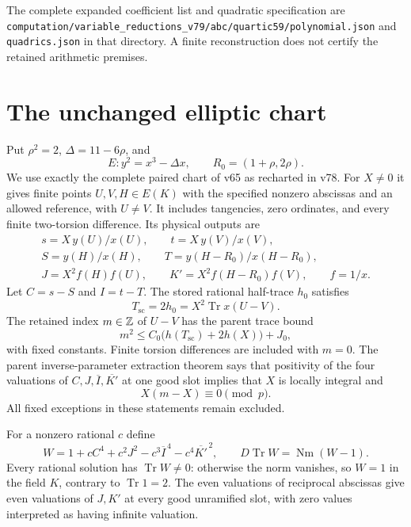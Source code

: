 \documentclass[11pt,a4paper]{article}
\DeclareMathOperator{\Tr}{Tr}\DeclareMathOperator{\Nm}{Nm}
\begin{document}
The complete expanded coefficient list and quadratic specification are
\nolinkurl{computation/variable_reductions_v79/abc/quartic59/polynomial.json}
and \nolinkurl{quadrics.json} in that directory. A finite reconstruction
does not certify the retained arithmetic premises.

\section{The unchanged elliptic chart}

Put $\rho^2=2$, $\Delta=11-6\rho$, and
\[
 E:y^2=x^3-\Delta x,\qquad R_0=(1+\rho,2\rho).
\]
We use exactly the complete paired chart of v65 as recharted in
v78. For $X\ne0$ it gives finite points $U,V,H\in E(K)$ with the
specified nonzero abscissas and an allowed reference, with $U\ne V$.
It includes tangencies, zero ordinates, and every finite two-torsion
difference. Its physical outputs are
\[
\begin{gathered}
 s=X\,y(U)/x(U),\qquad t=X\,y(V)/x(V),\\
 S=y(H)/x(H),\qquad T=y(H-R_0)/x(H-R_0),\\
 J=X^2f(H)f(U),\qquad K'=X^2f(H-R_0)f(V),\qquad f=1/x.
\end{gathered}
\]
Let $C=s-S$ and $I=t-T$. The stored rational half-trace $h_0$ satisfies
\[
 T_{\mathrm{sc}}=2h_0=X^2\Tr x(U-V).
\]
The retained index $m\in\mathbb Z$ of $U-V$ has the parent trace bound
\begin{equation}\label{eq:index}
 m^2\le C_0\bigl(h(T_{\mathrm{sc}})+2h(X)\bigr)+J_0,
\end{equation}
with fixed constants. Finite torsion differences are included with
$m=0$. The parent inverse-parameter extraction theorem says that
positivity of the four valuations of $C,J,\overline I,\overline{K'}$
at one good slot implies that $X$ is locally integral and
\begin{equation}\label{eq:local-label}
                         X(m-X)\equiv0\pmod p.
\end{equation}
All fixed exceptions in these statements remain excluded.

For a nonzero rational $c$ define
\begin{equation}\label{eq:detector}
 W=1+cC^4+c^2J^2-c^3\overline I^{\,4}-c^4\overline{K'}^{\,2},
 \qquad D\Tr W=\Nm(W-1).
\end{equation}
Every rational solution has $\Tr W\ne0$: otherwise the norm vanishes,
so $W=1$ in the field $K$, contrary to $\Tr 1=2$.
The even valuations of reciprocal abscissas give even valuations of
$J,K'$ at every good unramified slot, with zero values interpreted as
having infinite valuation.
\end{document}
